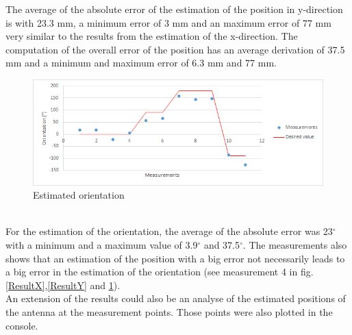 The average of the absolute error of the estimation of the position in y-direction is with 23.3 mm, a minimum error of 3 mm and an maximum error of 77 mm very similar to the results from the estimation of the x-direction. The computation of the overall error of the position has an average derivation of 37.5 mm and a minimum and maximum error of 6.3 mm and 77 mm.\\
\begin{figure}[!htbp]
\centering
\includegraphics[width = 14cm]{Pictures/ResultO}
\caption{Estimated orientation}
\label{ResultO}
\end{figure}\\
For the estimation of the orientation, the average of the absolute error was 23$^\circ$ with a minimum and a maximum value of 3.9$^\circ$ and 37.5$^\circ$. The measurements also shows that an estimation of the position with a big error not necessarily leads to a big error in the estimation of the orientation (see measurement 4 in fig.\ref{ResultX},\ref{ResultY} and \ref{ResultO}).\\
An extension of the results could also be an analyse of the estimated positions of the antenna at the measurement points. Those points were also plotted in the console. \\


